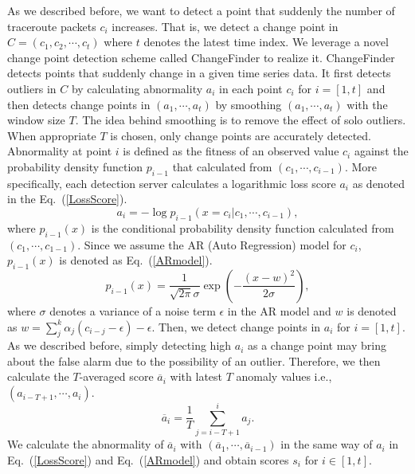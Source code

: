 \documentclass[conference]{IEEEtran}
\begin{document}
    As we described before, we want to detect a point that suddenly the number of traceroute packets $c_i$ increases.
    That is, we detect a change point in $C = (c_1, c_2, \cdots, c_t)$ where $t$ denotes the latest time index.
    We leverage a novel change point detection scheme called ChangeFinder \cite{changeFinder} to realize it.
    ChangeFinder detects points that suddenly change in a given time series data.
    It first detects outliers in $C$ by calculating abnormality $a_i$ in each point $c_i$ for $i = [1, t]$ and then detects change points in $(a_1, \cdots, a_t)$ by smoothing $(a_1, \cdots, a_t)$ with the window size $T$.
    The idea behind smoothing is to remove the effect of solo outliers.
    When appropriate $T$ is chosen, only change points are accurately detected.
    Abnormality at point $i$ is defined as the fitness of an observed value $c_i$ against the probability density function $p_{i-1}$ that calculated from $(c_1, \cdots, c_{i-1})$.
    More specifically, each detection server calculates a logarithmic loss score $a_i$ as denoted in the Eq.~(\ref{LossScore}).
    \begin{equation}
      a_i = - \log{p_{i-1}(x = c_i | c_1, \cdots, c_{i-1})},
      \label{LossScore}
    \end{equation}
    where $p_{i-1}(x)$ is the conditional probability density function calculated from $(c_1, \cdots, c_{1-1})$.
    Since we assume the AR (Auto Regression) model for $c_i$, $p_{i-1}(x)$ is denoted as Eq.~(\ref{ARmodel}).
    \begin{equation}
      p_{i-1}(x) = \frac{ 1 }{ \sqrt{ 2\pi } \sigma } \exp{ \left (- \frac{ (x-w)^2 }{ 2\sigma } \right ) },
      \label{ARmodel}
    \end{equation}
    where $\sigma$ denotes a variance of a noise term $\epsilon$ in the AR model and $w$ is denoted as $w = \sum_{j}^{k} \alpha_j (c_{i-j} - \epsilon) - \epsilon$.
    Then, we detect change points in $a_i$ for $i = [1, t]$.
    As we described before, simply detecting high $a_i$ as a change point may bring about the false alarm due to the possibility of an outlier.
    Therefore, we then calculate the $T$-averaged score $\overline{a}_i$ with latest $T$ anomaly values i.e., $(a_{i - T + 1}, \cdots, a_i)$.
    \begin{equation}
      \overline{a}_i = \frac{ 1 }{ T } \sum_{ j = i - T + 1 }^{ i } a_j.
      \label{Smoothing}
    \end{equation}
    We calculate the abnormality of $\overline{a}_i$ with $(\overline{a}_1, \cdots, \overline{a}_{i - 1})$ in the same way of $a_i$ in Eq.~(\ref{LossScore}) and Eq.~(\ref{ARmodel}) and obtain scores $s_i$ for $i \in [1, t]$.
\end{document}
